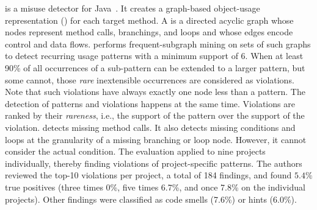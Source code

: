 \GROUMiner is a misuse detector for Java~\cite{NNP+09}.
It creates a graph-based object-usage representation (\GROUM) for each target method.
A \GROUM is a directed acyclic graph whose nodes represent method calls, branchings, and loops and whose edges encode control and data flows.
\GROUMiner performs frequent-subgraph mining on sets of such graphs to detect recurring usage patterns with a minimum support of $6$.
When at least 90\% of all occurrences of a sub-pattern can be extended to a larger pattern, but some cannot, those \emph{rare} inextensible occurrences are considered as violations.
Note that such violations have always exactly one node less than a pattern.
The detection of patterns and violations happens at the same time.
Violations are ranked by their \emph{rareness}, i.e., the support of the pattern over the support of the violation.
\GROUMiner detects missing method calls.
It also detects missing conditions and loops at the granularity of a missing branching or loop node.
However, it cannot consider the actual condition.
The evaluation applied \GROUMiner to nine projects individually, thereby finding violations of project-specific patterns.
The authors reviewed the top-10 violations per project, a total of 184 findings, and found $5.4\%$ true positives (three times 0\%, five times 6.7\%, and once 7.8\% on the individual projects).
Other findings were classified as code smells (7.6\%) or hints (6.0\%).

\vspace{0.03in}

